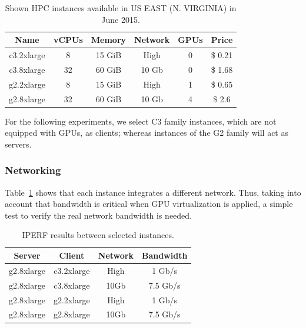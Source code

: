 \documentclass[a4paper,twoside]{article}
\begin{document}
\begin{table}[htb]
\renewcommand{\arraystretch}{1.3}
\caption{Shown HPC instances available in US EAST (N. VIRGINIA) in June 2015.}
\label{table:awsInstances}
\tabcolsep=0.09cm
\begin{center}\begin{tabular}{cccccc}
Name & vCPUs & Memory & Network & GPUs & Price\\ \hline \hline
c3.2xlarge & 8 & 15 GiB & High & 0 & \$ 0.21\\ \hline
c3.8xlarge & 32 & 60 GiB & 10 Gb & 0 & \$ 1.68 \\ \hline
g2.2xlarge & 8 & 15 GiB & High & 1 & \$ 0.65\\ \hline
g2.8xlarge & 32 & 60 GiB & 10 Gb & 4 & \$ 2.6 \\ \hline
\end{tabular}\end{center}\end{table}

For the following experiments, we select C3 family instances, which are not equipped with GPUs, as clients; whereas instances of the G2 family will act as servers.   

\subsubsection{Networking}
Table~\ref{table:awsInstances} shows that each instance integrates a different 
network. Thus, taking into account that bandwidth 
is critical when GPU virtualization is applied, a simple test to verify the 
real network bandwidth is needed.

\begin{table}[htb]
\renewcommand{\arraystretch}{1.3}
\caption{IPERF results between selected instances.}
\label{table:iperf}
\tabcolsep=0.24cm
\begin{center}\begin{tabular}{cccc}
Server & Client & Network & Bandwidth\\ \hline \hline
g2.8xlarge & c3.2xlarge & High & 1  Gb/s\\ \hline
g2.8xlarge & c3.8xlarge & 10Gb & 7.5  Gb/s\\ \hline
g2.8xlarge & g2.2xlarge & High & 1 Gb/s\\ \hline
g2.8xlarge & g2.8xlarge & 10Gb & 7.5  Gb/s\\ \hline
\end{tabular}\end{center}\end{table}
\end{document}
